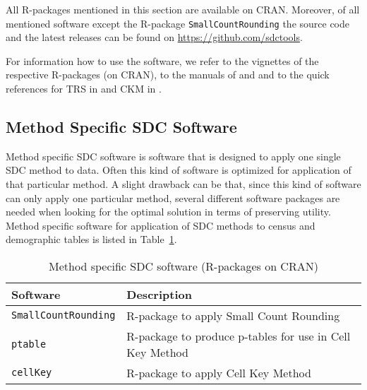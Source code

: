 All R-packages mentioned in this section are available on CRAN. Moreover, of all mentioned software except the R-package \texttt{SmallCountRounding} the source code and the latest releases can be found on \url{https://github.com/sdctools}. 

For information how to use the software, we refer to the vignettes of the respective R-packages (on CRAN), to the manuals of \margus \cite{mumanual} and \targus \cite{taumanual} and to the quick references for TRS in \margus \cite{QuickRefMu} and CKM in \targus \cite{QuickRefTau42x}.

\subsection{Method Specific SDC Software}\label{subsection:method-specifi-software}
Method specific SDC software is software that is designed to apply one single SDC method to data. Often this kind of software is optimized for application of that particular method. A slight drawback can be that, since this kind of software can only apply one particular method, several different software packages are needed when looking for the optimal solution in terms of preserving utility. Method specific software for application of SDC methods to census and demographic tables is listed in Table~\ref{table:specificsoftware-methods}.
\begin{table}[!htb]
\begin{tabular}{lp{}}
Software & Description\\\hline
\texttt{SmallCountRounding} & R-package to apply Small Count Rounding\\
\texttt{ptable} & R-package to produce p-tables for use in Cell Key Method\\
\texttt{cellKey} & R-package to apply Cell Key Method\\
\end{tabular}
\caption{Method specific SDC software (R-packages on CRAN)}\label{table:specificsoftware-methods}
\end{table}

